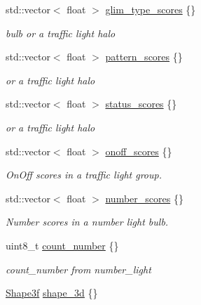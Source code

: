 \begin{DoxyCompactItemize}
std\+::vector$<$ float $>$ \hyperlink{structmaf__perception__interface_1_1TrafficLightSingleFrame_a2d71445b58ad62d8d3055382c87e577b}{glim\+\_\+type\+\_\+scores} \{\}
\begin{DoxyCompactList}\small\item\em bulb or a traffic light halo \end{DoxyCompactList}\item 
std\+::vector$<$ float $>$ \hyperlink{structmaf__perception__interface_1_1TrafficLightSingleFrame_ad673042d97e4322d27174060098e9a79}{pattern\+\_\+scores} \{\}
\begin{DoxyCompactList}\small\item\em or a traffic light halo \end{DoxyCompactList}\item 
std\+::vector$<$ float $>$ \hyperlink{structmaf__perception__interface_1_1TrafficLightSingleFrame_a821caeced422a4d171dbf258c911c214}{status\+\_\+scores} \{\}
\begin{DoxyCompactList}\small\item\em or a traffic light halo \end{DoxyCompactList}\item 
std\+::vector$<$ float $>$ \hyperlink{structmaf__perception__interface_1_1TrafficLightSingleFrame_a17aaf38c3029a589bf43a07d1ca7718b}{onoff\+\_\+scores} \{\}
\begin{DoxyCompactList}\small\item\em On\+Off scores in a traffic light group. \end{DoxyCompactList}\item 
std\+::vector$<$ float $>$ \hyperlink{structmaf__perception__interface_1_1TrafficLightSingleFrame_ab35adc3de883e732a5d3f0fcc55cb625}{number\+\_\+scores} \{\}
\begin{DoxyCompactList}\small\item\em Number scores in a number light bulb. \end{DoxyCompactList}\item 
uint8\+\_\+t \hyperlink{structmaf__perception__interface_1_1TrafficLightSingleFrame_ae2708895bb978a2b9ecdbf9e28bd4f46}{count\+\_\+number} \{\}
\begin{DoxyCompactList}\small\item\em count\+\_\+number from number\+\_\+light \end{DoxyCompactList}\item 
\hyperlink{structmaf__perception__interface_1_1Shape3f}{Shape3f} \hyperlink{structmaf__perception__interface_1_1TrafficLightSingleFrame_af979075d205f884867768448148d87ea}{shape\+\_\+3d} \{\}

\end{DoxyCompactItemize}
